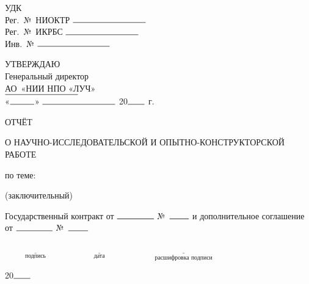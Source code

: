 
\thispagestyle{empty}
\loochHat

\vspace{1cm}

\noindent
\begin{minipage}{0.45\textwidth}
УДК\\
Рег.~№~НИОКТР \(\rule{3cm}{0.5pt}\)\\
Рег.~№~ИКРБС  \(\rule{3cm}{0.5pt}\)\\
Инв.~№ \(\rule{3cm}{0.5pt}\)
\end{minipage}\hfill
\begin{minipage}{0.45\textwidth}
УТВЕРЖДАЮ\\
Генеральный директор    \\   
АО~«НИИ НПО «ЛУЧ»\\
\(\rule{3cm}{0.5pt}\) \loochDir \\
«\(\rule{1cm}{0.5pt}\)»   \(\rule{3cm}{0.5pt}\) 20\(\rule{0.7cm}{0.5pt}\) г.
\end{minipage}

\vspace{1cm}

\begin{center}
ОТЧЁТ

О НАУЧНО-ИССЛЕДОВАТЕЛЬСКОЙ И ОПЫТНО-КОНСТРУКТОРСКОЙ РАБОТЕ

\vspace{0.8cm}

по теме:

\loochFinRepTitle
 
(заключительный)

\vspace{0.8cm}


\vspace{0.8cm}

Государственный контракт от \(\rule{1.5cm}{0.5pt}\) №~\(\rule{0.8cm}{0.5pt}\) и дополнительное соглашение от \(\rule{1.5cm}{0.5pt}\) №~\(\rule{0.8cm}{0.5pt}\)
\end{center}

\vspace{2cm}

\noindent
\begin{minipage}{0.25\textwidth}
\begin{singlespace}
\loochRepSV
\end{singlespace}
\end{minipage}\hspace{1cm}
\begin{minipage}{0.75\textwidth}
\begin{singlespace}
\(\underset{\text{подпись}}{\underline{\hspace{3cm}}}\)
\(\underset{\text{дата}}{\underline{\hspace{3cm}}}\)
\(\underset{\text{расшифровка подписи}}{\underline{\hspace{5cm}}}\)
\end{singlespace}
\end{minipage}

\vfill
\begin{center}
\loochRepLocation{} 20\(\rule{0.7cm}{0.5pt}\)
\end{center}


